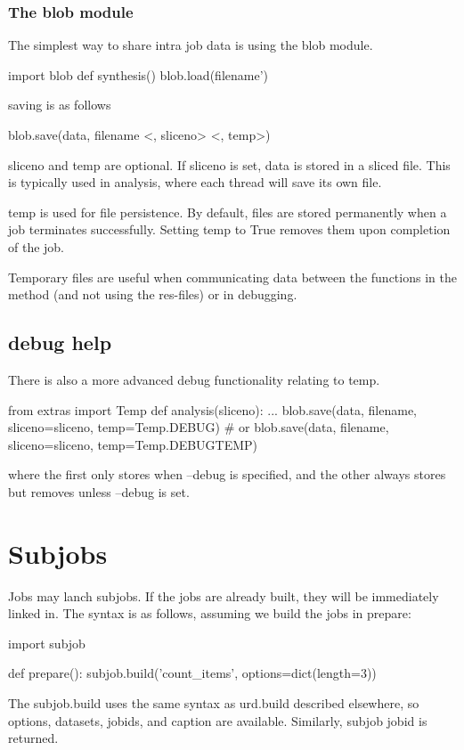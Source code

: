 \subsubsection*{The blob module}
The simplest way to share intra job data is using the blob module.

\begin{python}
import blob
def synthesis()
  blob.load(filename')
\end{python}
saving is as follows

\begin{python}
  blob.save(data, filename <, sliceno> <, temp>)
\end{python}
sliceno and temp are optional.  If sliceno is set, data is stored in a
sliced file.  This is typically used in analysis, where each thread
will save its own file.

temp is used for file persistence.  By default, files are stored
permanently when a job terminates successfully.  Setting temp to True
removes them upon completion of the job.

Temporary files are useful when communicating data between the
functions in the method (and not using the res-files) or in debugging.


\subsection{debug help}
There is also a more advanced debug functionality relating to temp.

\begin{python}
from extras import Temp
def analysis(sliceno):
  ...
  blob.save(data, filename, sliceno=sliceno, temp=Temp.DEBUG)
  # or
  blob.save(data, filename, sliceno=sliceno, temp=Temp.DEBUGTEMP)
\end{python}
where the first only stores when --debug is specified, and the other
always stores but removes unless --debug is set.


\newpage
\section{Subjobs}

Jobs may lanch subjobs.  If the jobs are already built, they will be
immediately linked in.  The syntax is as follows, assuming we build
the jobs in prepare:

\begin{python}
import subjob

def prepare():
  subjob.build('count_items', options=dict(length=3))
\end{python}
The subjob.build uses the same syntax as urd.build described
elsewhere, so options, datasets, jobids, and caption are available.
Similarly, subjob jobid is returned.

